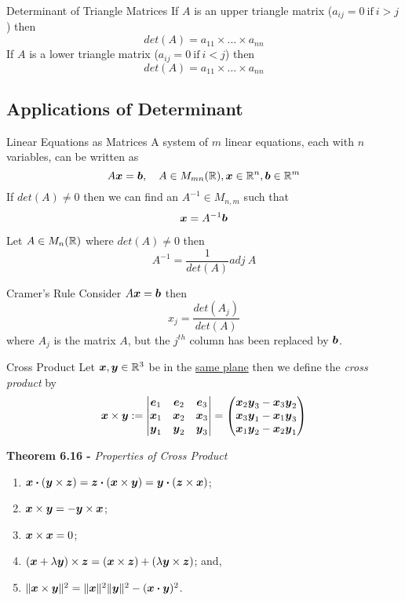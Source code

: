 \documentclass[11pt,a4paper]{article}
\begin{document}
\subtitle{Remark 6.11 - }{Determinant of Triangle Matrices}
If $A$ is an upper triangle matrix ($a_{ij} = 0 \mathrm{\ if\ } i > j$) then $$det(A) = a_{11} \times \dots \times a_{nn}$$
If $A$ is a lower triangle matrix ($a_{ij} = 0 \mathrm{\ if\ } i < j$) then $$det(A) = a_{11} \times \dots \times a_{nn}$$

\subsection{Applications of Determinant}

\subtitle{Theorem 6.12 - }{Linear Equations as Matrices}
A system of $m$ linear equations, each with $n$ variables, can be written as $$A\boldsymbol{x} = \boldsymbol{b},\quad A \in M_{mn}(\mathbb{R}), \boldsymbol{x} \in \mathbb{R}^n, \boldsymbol{b} \in \mathbb{R}^m$$
If $det(A) \not = 0$ then we can find an $A^{-1} \in M_{n,m}$ such that $$\boldsymbol{x} = A^{-1}\boldsymbol{b}$$

\subtitle{Theorem 6.13}{}
Let $A \in M_n(\mathbb{R})$ where $det(A) \not = 0$ then $$A^{-1} = \frac{1}{det(A)}adj\ A$$

\subtitle{Theorem 6.14 - }{Cramer's Rule}
Consider $A\boldsymbol{x} = \boldsymbol{b}$ then $$x_j = \frac{det(A_j)}{det(A)}$$ where $A_j$ is the matrix $A$, but the $j^{th}$ column has been replaced by $\boldsymbol{b}$. \\

\subtitle{Definition 6.15 - }{Cross Product}
Let $\boldsymbol{x}, \boldsymbol{y} \in \mathbb{R}^3$ be in the \underline{same plane} then we define the \textit{cross product} by
$$\boldsymbol{x} \times \boldsymbol{y} := \begin{vmatrix}
  \boldsymbol{e}_1 & \boldsymbol{e}_2 & \boldsymbol{e}_3 \\
  \boldsymbol{x}_1 & \boldsymbol{x}_2 & \boldsymbol{x}_3 \\
  \boldsymbol{y}_1 & \boldsymbol{y}_2 & \boldsymbol{y}_3
\end{vmatrix} = \begin{pmatrix}
  \boldsymbol{x}_2\boldsymbol{y}_3 - \boldsymbol{x}_3\boldsymbol{y}_2 \\
  \boldsymbol{x}_3\boldsymbol{y}_1 - \boldsymbol{x}_1\boldsymbol{y}_3 \\
  \boldsymbol{x}_1\boldsymbol{y}_2 - \boldsymbol{x}_2\boldsymbol{y}_1
\end{pmatrix}$$

\textbf{Theorem 6.16 - }\textit{Properties of Cross Product}
\begin{enumerate}[label=\roman*)]
  \item $ \boldsymbol{x} \boldsymbol{\cdot} (\boldsymbol{y} \times \boldsymbol{z}) = \boldsymbol{z} \boldsymbol{\cdot} (\boldsymbol{x} \times \boldsymbol{y}) = \boldsymbol{y} \boldsymbol{\cdot} (\boldsymbol{z} \times \boldsymbol{x}) $;
  \item $ \boldsymbol{x} \times \boldsymbol{y} = - \boldsymbol{y} \times \boldsymbol{x} $;
  \item $ \boldsymbol{x} \times \boldsymbol{x} = 0 $;
  \item $ (\boldsymbol{x} + \lambda\boldsymbol{y}) \times \boldsymbol{z} = (\boldsymbol{x} \times \boldsymbol{z}) + (\lambda\boldsymbol{y} \times \boldsymbol{z}) $; and,
  \item $ \|\boldsymbol{x} \times \boldsymbol{y}\|^2 = \|\boldsymbol{x}\|^2\|\boldsymbol{y}\|^2 - (\boldsymbol{x} \boldsymbol{\cdot} \boldsymbol{y})^2$.
\end{enumerate}
\end{document}
